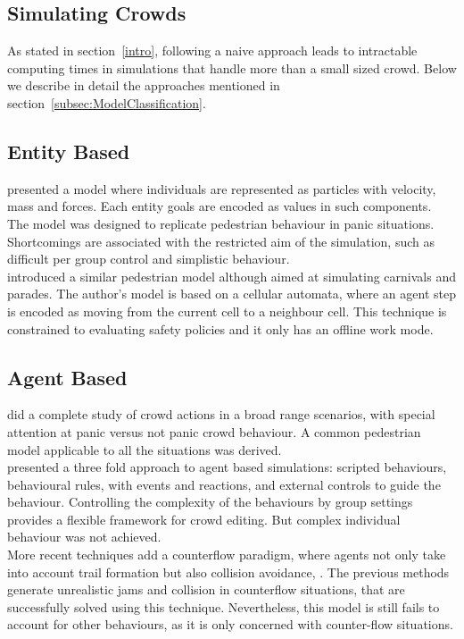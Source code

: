 \documentclass[6pt]{article} %
\begin{document}
\begin{multicols}{2}
\section{Simulating Crowds}

As stated in section~\ref{intro}, following a naive approach leads to intractable computing times in simulations that handle more than a small sized crowd.
Below we describe in detail the approaches mentioned in section~\ref{subsec:ModelClassification}. 

\subsection{Entity Based}

\cite{Helbing2000} presented a model where individuals are represented as particles with velocity, mass and forces.
Each entity goals are encoded as values in such components.
The model was designed to replicate pedestrian behaviour in panic situations.
Shortcomings are associated with the restricted aim of the simulation, such as difficult per group control and simplistic behaviour.\\

\cite{batty2003} introduced a similar pedestrian model although aimed at simulating carnivals and parades.
The author's model is based on a cellular automata, where an agent step is encoded as moving from the current cell to a neighbour cell.
This technique is constrained to evaluating safety policies and it only has an offline work mode.

\subsection{Agent Based}

\cite{helbing2002} did a complete study of crowd actions in a broad range scenarios, with special attention at panic versus not panic crowd behaviour.
A common pedestrian model applicable to all the situations was derived.\\

\cite{raupp2001} presented a three fold approach to agent based simulations: scripted behaviours, behavioural rules, with events and reactions, and external controls to guide the behaviour.
Controlling the complexity of the behaviours by group settings provides a flexible framework for crowd editing.
But complex individual behaviour was not achieved.\\

More recent techniques add a counterflow paradigm, where agents not only take into account trail formation but also collision avoidance, \cite{heliovaara2012}.
The previous methods generate unrealistic jams and collision in counterflow situations, that are successfully solved using this technique.
Nevertheless, this model is still fails to account for other behaviours, as it is only concerned with counter-flow situations.


\end{multicols}
\end{document}
